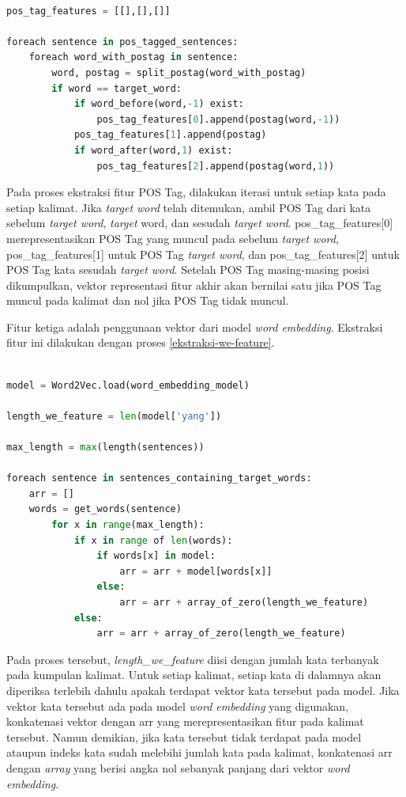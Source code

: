 \clearpage

\begin{lstlisting}[language=python,caption={Ekstraksi Fitur POS Tag}, label={fitur-postag}]

pos_tag_features = [[],[],[]]

foreach sentence in pos_tagged_sentences:
	foreach word_with_postag in sentence:
		word, postag = split_postag(word_with_postag)
		if word == target_word:
			if word_before(word,-1) exist:
				pos_tag_features[0].append(postag(word,-1))
			pos_tag_features[1].append(postag)
			if word_after(word,1) exist:
				pos_tag_features[2].append(postag(word,1))

\end{lstlisting}

Pada proses ekstraksi fitur POS Tag, dilakukan iterasi untuk setiap kata pada setiap kalimat. Jika \textit{target word} telah ditemukan, ambil POS Tag dari kata sebelum \textit{target word}, \textit{target} word, dan sesudah \textit{target word}. pos\_tag\_features[0] merepresentasikan POS Tag yang muncul pada sebelum \textit{target word}, pos\_tag\_features[1] untuk POS Tag \textit{target word}, dan pos\_tag\_features[2] untuk POS Tag kata sesudah \textit{target word}. Setelah POS Tag masing-masing posisi dikumpulkan, vektor representasi fitur akhir akan bernilai satu jika POS Tag muncul pada kalimat dan nol jika POS Tag tidak muncul. 

Fitur ketiga adalah penggunaan vektor dari model \textit{word embedding}. Ekstraksi fitur ini dilakukan dengan proses \ref{ekstraksi-we-feature}.

\clearpage

\begin{lstlisting}[language = python, caption={Ekstraksi fitur \textit{word embedding}}, label={ekstraksi-we-feature}]

model = Word2Vec.load(word_embedding_model)

length_we_feature = len(model['yang'])

max_length = max(length(sentences))

foreach sentence in sentences_containing_target_words:
	arr = []
	words = get_words(sentence)
		for x in range(max_length):
			if x in range of len(words):
				if words[x] in model:
					arr = arr + model[words[x]]
				else:
					arr = arr + array_of_zero(length_we_feature)
			else:
				arr = arr + array_of_zero(length_we_feature)
\end{lstlisting}

Pada proses tersebut, \textit{length\_we\_feature} diisi dengan jumlah kata terbanyak pada kumpulan kalimat. Untuk setiap kalimat, setiap kata di dalamnya akan diperiksa terlebih dahulu apakah terdapat vektor kata tersebut pada model. Jika vektor kata tersebut ada pada model \textit{word embedding} yang digunakan, konkatenasi vektor dengan arr yang merepresentasikan fitur pada kalimat tersebut. Namun demikian, jika kata tersebut tidak terdapat pada model ataupun indeks kata sudah melebihi jumlah kata pada kalimat, konkatenasi arr dengan \textit{array} yang berisi angka nol sebanyak panjang dari vektor \textit{word embedding}.

